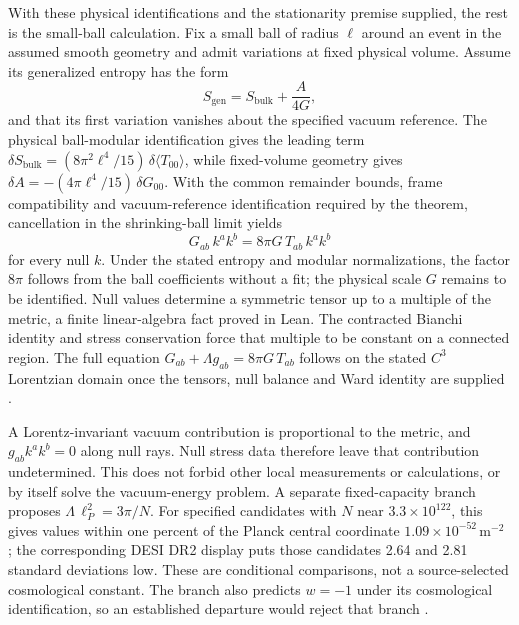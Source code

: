 \documentclass[12pt]{article}
\newcommand{\Gab}{G_{ab}}
\newcommand{\Tab}{T_{ab}}
\begin{document}
\begin{doublespace}
With these physical identifications and the stationarity premise supplied, the rest is the small-ball calculation. Fix a small ball of radius $\ell$ around an event in the assumed smooth geometry and admit variations at fixed physical volume. Assume its generalized entropy has the form
\begin{equation}
S_{\mathrm{gen}} = S_{\mathrm{bulk}} + \frac{A}{4G},
\end{equation}
and that its first variation vanishes about the specified vacuum reference. The physical ball-modular identification gives the leading term $\delta S_{\mathrm{bulk}} = (8\pi^2\ell^4/15)\,\delta\langle T_{00}\rangle$, while fixed-volume geometry gives $\delta A = -(4\pi\ell^4/15)\,\delta G_{00}$. With the common remainder bounds, frame compatibility and vacuum-reference identification required by the theorem, cancellation in the shrinking-ball limit yields
\begin{equation}
\Gab\,k^ak^b = 8\pi G\,\Tab\,k^ak^b
\end{equation}
for every null $k$. Under the stated entropy and modular normalizations, the factor $8\pi$ follows from the ball coefficients without a fit; the physical scale $G$ remains to be identified. Null values determine a symmetric tensor up to a multiple of the metric, a finite linear-algebra fact proved in Lean. The contracted Bianchi identity and stress conservation force that multiple to be constant on a connected region. The full equation $\Gab+\Lambda g_{ab}=8\pi G\,\Tab$ follows on the stated $C^3$ Lorentzian domain once the tensors, null balance and Ward identity are supplied \cite{ophflagship,ophEinstein}.

A Lorentz-invariant vacuum contribution is proportional to the metric, and $g_{ab}k^ak^b=0$ along null rays. Null stress data therefore leave that contribution undetermined. This does not forbid other local measurements or calculations, or by itself solve the vacuum-energy problem. A separate fixed-capacity branch proposes $\Lambda\,\ell_P^2=3\pi/N$. For specified candidates with $N$ near $3.3\times10^{122}$, this gives values within one percent of the Planck central coordinate $1.09\times10^{-52}\,\mathrm{m}^{-2}$ \cite{ophflagship}; the corresponding DESI DR2 display puts those candidates 2.64 and 2.81 standard deviations low. These are conditional comparisons, not a source-selected cosmological constant. The branch also predicts $w=-1$ under its cosmological identification, so an established departure would reject that branch \cite{desidr2}.


\end{doublespace}
\end{document}
